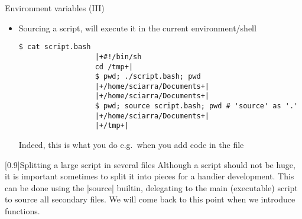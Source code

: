 \begin{frame}[fragile]{Environment variables (III)}
    \vspace{-3mm}
    \begin{itemize}
        \item Sourcing a script, will execute it in the current environment/shell
              \begin{lstlisting}[style=MyBash, numbers=none, aboveskip=2mm, belowskip=-6mm, xrightmargin=20mm]
                  $ cat script.bash
                  |+#!/bin/sh
                  cd /tmp+|
                  $ pwd; ./script.bash; pwd
                  |+/home/sciarra/Documents+|
                  |+/home/sciarra/Documents+|
                  $ pwd; source script.bash; pwd # 'source' as '.'
                  |+/home/sciarra/Documents+|
                  |+/tmp+|
              \end{lstlisting}
              Indeed, this is what you do e.g.\ when you add code in the  file
    \end{itemize}
    \begin{varblock}{}[0.9\textwidth]{Splitting a large script in several files}
        Although a script should not be huge, it is important sometimes to split it into pieces for a handier development.
        This can be done using the \bash|source| builtin, delegating to the main (executable) script to source all secondary files.
        We will come back to this point when we introduce functions.
    \end{varblock}
\end{frame}



